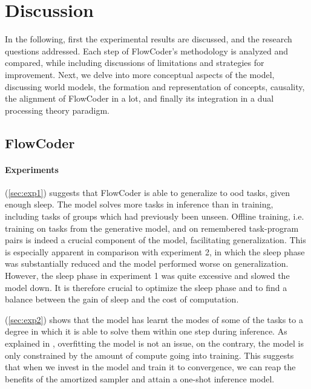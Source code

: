 \section{Discussion}\label{sec:discussion}

In the following, first the experimental results are discussed, and the research questions addressed. Each step of FlowCoder's methodology is analyzed and compared, while including discussions of limitations and strategies for improvement.
Next, we delve into more conceptual aspects of the model, discussing world models, the formation and representation of concepts, causality, the alignment of FlowCoder in a \acrshort{lot}, and finally its integration in a dual processing theory paradigm. 

\subsection{FlowCoder}

\paragraph*{Experiments}


 (\autoref{sec:exp1}) suggests that FlowCoder is able to generalize to \acrlong{ood} tasks, given enough sleep. The model solves more tasks in inference than in training, including tasks of groups which had previously been unseen. Offline training, i.e. training on tasks from the generative model, and on remembered task-program pairs is indeed a crucial component of the model, facilitating generalization. This is especially apparent in comparison with experiment 2, in which the sleep phase was substantially reduced and the model performed worse on generalization. However, the sleep phase in experiment 1 was quite excessive and slowed the model down. It is therefore crucial to optimize the sleep phase and to find a balance between the gain of sleep and the cost of computation.

 (\autoref{sec:exp2}) shows that the model has learnt the modes of some of the tasks to a degree in which it is able to solve them within one step during inference. As explained in \cite{bengioGFlowNetFoundations2023}, overfitting the model is not an issue, on the contrary, the model is only constrained by the amount of compute going into training. This suggests that when we invest in the model and train it to convergence, we can reap the benefits of the amortized sampler and attain a one-shot inference model.

